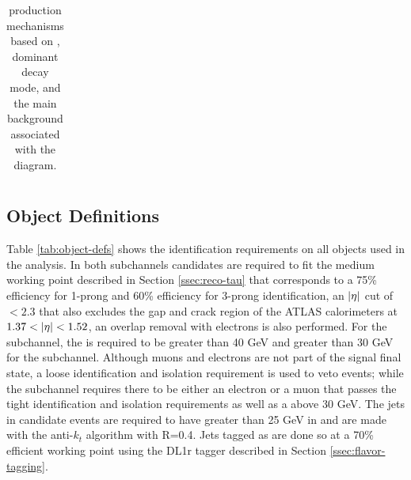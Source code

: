 \begin{table}
{\begin{tabular}{| c | c | c | c |}
			\end{tabular}}
			\caption{\Hpm production mechanisms based on \mHpm, dominant \Hpm decay mode, and the main background associated with the diagram.}
			\label{tab:hplus-production}
		\end{table}

		\subsection{Object Definitions}\label{ssec:object-def}
		Table \ref{tab:object-defs} shows the identification requirements on all objects used in the analysis. In both subchannels \tauhad candidates are required to fit the medium working point described in Section \ref{ssec:reco-tau} that corresponds to a 75\% efficiency for 1-prong and 60\% efficiency for 3-prong \tauhad identification, an $|{\eta}|$ cut of $< 2.3$ that also excludes the gap and crack region of the ATLAS calorimeters at $1.37 < |{\eta}| < 1.52$, an overlap removal with electrons is also performed. For the \taujets subchannel, the \tauhad \pt is required to be greater than 40 GeV and greater than 30 GeV for the \taulep subchannel. Although muons and electrons are not part of the \taujets signal final state, a loose identification and isolation requirement is used to veto events; while the \taulep subchannel requires there to be either an electron or a muon that passes the tight identification and isolation requirements as well as a \pt above 30 GeV. The jets in candidate events are required to have greater than 25 GeV in \pt and are made with the anti-$k_t$ algorithm with R=0.4. Jets tagged as \bjets are done so at a 70\% efficient working point using the DL1r tagger described in Section \ref{ssec:flavor-tagging}.

